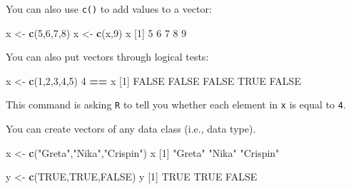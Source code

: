 \documentclass[
]{book}
\newenvironment{Shaded}{\begin{snugshade}}{\end{snugshade}}
\newcommand{\ConstantTok}[1]{\textcolor[rgb]{0.56,0.35,0.01}{#1}}
\newcommand{\DecValTok}[1]{\textcolor[rgb]{0.00,0.00,0.81}{#1}}
\newcommand{\FunctionTok}[1]{\textcolor[rgb]{0.13,0.29,0.53}{\textbf{#1}}}
\newcommand{\NormalTok}[1]{#1}
\newcommand{\OtherTok}[1]{\textcolor[rgb]{0.56,0.35,0.01}{#1}}
\newcommand{\SpecialCharTok}[1]{\textcolor[rgb]{0.81,0.36,0.00}{\textbf{#1}}}
\newcommand{\StringTok}[1]{\textcolor[rgb]{0.31,0.60,0.02}{#1}}
\begin{document}
You can also use \texttt{c()} to add values to a vector:

\begin{Shaded}
\begin{Highlighting}[]
\NormalTok{x }\OtherTok{\textless{}{-}} \FunctionTok{c}\NormalTok{(}\DecValTok{5}\NormalTok{,}\DecValTok{6}\NormalTok{,}\DecValTok{7}\NormalTok{,}\DecValTok{8}\NormalTok{)}
\NormalTok{x }\OtherTok{\textless{}{-}} \FunctionTok{c}\NormalTok{(x,}\DecValTok{9}\NormalTok{)}
\NormalTok{x}
\NormalTok{[}\DecValTok{1}\NormalTok{] }\DecValTok{5} \DecValTok{6} \DecValTok{7} \DecValTok{8} \DecValTok{9}
\end{Highlighting}
\end{Shaded}

You can also put vectors through logical tests:

\begin{Shaded}
\begin{Highlighting}[]
\NormalTok{x }\OtherTok{\textless{}{-}} \FunctionTok{c}\NormalTok{(}\DecValTok{1}\NormalTok{,}\DecValTok{2}\NormalTok{,}\DecValTok{3}\NormalTok{,}\DecValTok{4}\NormalTok{,}\DecValTok{5}\NormalTok{)}
\DecValTok{4} \SpecialCharTok{==}\NormalTok{ x}
\NormalTok{[}\DecValTok{1}\NormalTok{] }\ConstantTok{FALSE} \ConstantTok{FALSE} \ConstantTok{FALSE}  \ConstantTok{TRUE} \ConstantTok{FALSE}
\end{Highlighting}
\end{Shaded}

This command is asking \texttt{R} to tell you whether each element in \texttt{x} is equal to \texttt{4}.

You can create vectors of any data class (i.e., data type).

\begin{Shaded}
\begin{Highlighting}[]
\NormalTok{x }\OtherTok{\textless{}{-}} \FunctionTok{c}\NormalTok{(}\StringTok{"Greta"}\NormalTok{,}\StringTok{"Nika"}\NormalTok{,}\StringTok{"Crispin"}\NormalTok{) }
\NormalTok{x}
\NormalTok{[}\DecValTok{1}\NormalTok{] }\StringTok{"Greta"}   \StringTok{"Nika"}    \StringTok{"Crispin"}
\end{Highlighting}
\end{Shaded}

\begin{Shaded}
\begin{Highlighting}[]
\NormalTok{y }\OtherTok{\textless{}{-}} \FunctionTok{c}\NormalTok{(}\ConstantTok{TRUE}\NormalTok{,}\ConstantTok{TRUE}\NormalTok{,}\ConstantTok{FALSE}\NormalTok{)}
\NormalTok{y}
\NormalTok{[}\DecValTok{1}\NormalTok{]  }\ConstantTok{TRUE}  \ConstantTok{TRUE} \ConstantTok{FALSE}
\end{Highlighting}
\end{Shaded}
\end{document}
